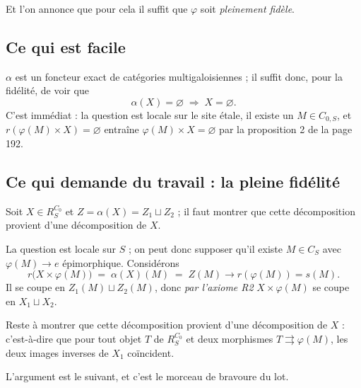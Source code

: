 \documentclass[11pt,a4paper]{article}
\begin{document}
Et l'on annonce que pour cela il suffit que $\varphi$ soit \emph{pleinement
fidèle}.

\subsection*{Ce qui est facile}

$\alpha$ est un foncteur exact de catégories multigaloisiennes ; il suffit donc,
pour la fidélité, de voir que
\[
  \alpha(X) = \varnothing \;\Longrightarrow\; X = \varnothing .
\]
C'est immédiat : la question est locale sur le site étale, il existe un
$M \in C_{0,S}$, et
$r(\varphi(M) \times X) = \varnothing$ entraîne
$\varphi(M) \times X = \varnothing$ par la proposition 2 de la page 192.

\subsection*{Ce qui demande du travail : la pleine fidélité}

Soit $X \in R_{S}^{C_{0}}$ et $Z = \alpha(X) = Z_{1} \sqcup Z_{2}$ ; il faut
montrer que cette décomposition provient d'une décomposition de $X$.

La question est locale sur $S$ ; on peut donc supposer qu'il existe
$M \in C_{S}$ avec $\varphi(M) \to e$ épimorphique. Considérons
\[
  r\bigl(X \times \varphi(M)\bigr) \;=\; \alpha(X)(M) \;=\; Z(M)
  \longrightarrow r(\varphi(M)) = s(M) .
\]
Il se coupe en $Z_{1}(M) \sqcup Z_{2}(M)$, donc \emph{par l'axiome R2}
$X \times \varphi(M)$ se coupe en $X_{1} \sqcup X_{2}$.

Reste à montrer que cette décomposition provient d'une décomposition de $X$ :
c'est-à-dire que pour tout objet $T$ de $R_{S}^{C_{0}}$ et deux morphismes
$T \rightrightarrows \varphi(M)$, les deux images inverses de $X_{1}$
coïncident.


L'argument est le suivant, et c'est le morceau de bravoure du lot.
\end{document}
